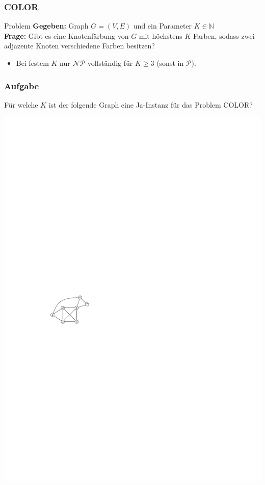 \begin{frame}
\frametitle{COLOR}
\begin{block}{Problem}
\textbf{Gegeben:} Graph $G = (V, E)$ und ein Parameter $K \in \mathbb{N}$\\
\textbf{Frage:} Gibt es eine Knotenfärbung von $G$ mit höchstens $K$ Farben, sodass zwei adjazente Knoten verschiedene Farben besitzen?
\end{block}
\begin{itemize}
\item Bei festem $K$ nur $\mathcal{NP}$-vollständig für $K \geq 3$ (sonst in $\mathcal{P}$).
\end{itemize}
\end{frame}

\begin{frame}
	\frametitle{Aufgabe}
	
	Für welche $K$ ist der folgende Graph eine Ja-Instanz für das Problem COLOR?
	
	\begin{center}\includegraphics[scale=1.5]{images/tut7-graph}\end{center}
\end{frame}

